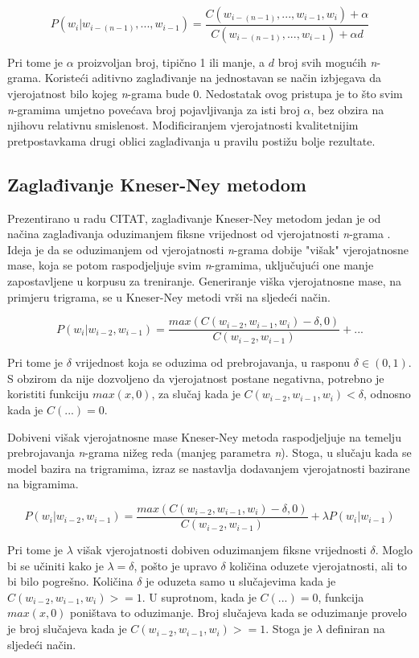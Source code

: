 \documentclass[times, utf8, diplomski, numeric]{fer}
\begin{document}
\[
P(w_i | w_{i - (n - 1)}, ... , w_{i - 1}) = \frac{C(w_{i - (n - 1)}, ... , w_{i - 1}, w_i) + \alpha}{C(w_{i - (n - 1)}, ... , w_{i - 1}) + \alpha d}
\]

Pri tome je $\alpha$ proizvoljan broj, tipično 1 ili manje, a $d$ broj svih mogućih \textit{n}-grama. Koristeći aditivno zaglađivanje na jednostavan se način izbjegava da vjerojatnost bilo kojeg \textit{n}-grama bude 0. Nedostatak ovog pristupa je to što svim \textit{n}-gramima umjetno povećava broj pojavljivanja za isti broj $\alpha$, bez obzira na njihovu relativnu smislenost. Modificiranjem vjerojatnosti kvalitetnijim pretpostavkama drugi oblici zaglađivanja u pravilu postižu bolje rezultate.

\subsection{Zaglađivanje Kneser-Ney metodom}

Prezentirano u radu CITAT, zaglađivanje Kneser-Ney metodom jedan je od načina zaglađivanja oduzimanjem fiksne vrijednost od vjerojatnosti \textit{n}-grama . Ideja je da se oduzimanjem od vjerojatnosti \textit{n}-grama dobije "višak" vjerojatnosne mase, koja se potom raspodjeljuje svim \textit{n}-gramima, uključujući one manje zapostavljene u korpusu za treniranje. Generiranje viška vjerojatnosne mase, na primjeru trigrama, se u Kneser-Ney metodi vrši na sljedeći način.

\[
P(w_i | w_{i - 2}, w_{i - 1}) =
  \frac{max\left(C(w_{i - 2}, w_{i - 1}, w_i) - \delta, 0\right)}
    {C(w_{i - 2}, w_{i - 1})} + ...
\]

Pri tome je $\delta$ vrijednost koja se oduzima od prebrojavanja, u rasponu $\delta \in (0, 1)$. S obzirom da nije dozvoljeno da vjerojatnost postane negativna, potrebno je koristiti funkciju $max(x, 0)$, za slučaj kada je $C(w_{i - 2}, w_{i - 1}, w_i) < \delta$, odnosno kada je $C(...) = 0$. 

Dobiveni višak vjerojatnosne mase Kneser-Ney metoda raspodjeljuje na temelju prebrojavanja \textit{n}-grama nižeg reda (manjeg parametra \textit{n}). Stoga, u slučaju kada se model bazira na trigramima, izraz se nastavlja dodavanjem vjerojatnosti bazirane na bigramima.

\[
P(w_i | w_{i - 2}, w_{i - 1}) =
  \frac{max\left(C(w_{i - 2}, w_{i - 1}, w_i) - \delta, 0\right)}
    {C(w_{i - 2}, w_{i - 1})} + \lambda P(w_i | w_{i - 1})
\]

Pri tome je $\lambda$ višak vjerojatnosti dobiven oduzimanjem fiksne vrijednosti $\delta$. Moglo bi se učiniti kako je $\lambda = \delta$, pošto je upravo $\delta$ količina oduzete vjerojatnosti, ali to bi bilo pogrešno. Količina $\delta$ je oduzeta samo u slučajevima kada je $C(w_{i - 2}, w_{i - 1}, w_i) >= 1$. U suprotnom, kada je $C(...) = 0$, funkcija $max(x, 0)$ poništava to oduzimanje. Broj slučajeva kada se oduzimanje provelo je broj slučajeva kada je $C(w_{i - 2}, w_{i - 1}, w_i) >= 1$. Stoga je $\lambda$ definiran na sljedeći način.
\end{document}
